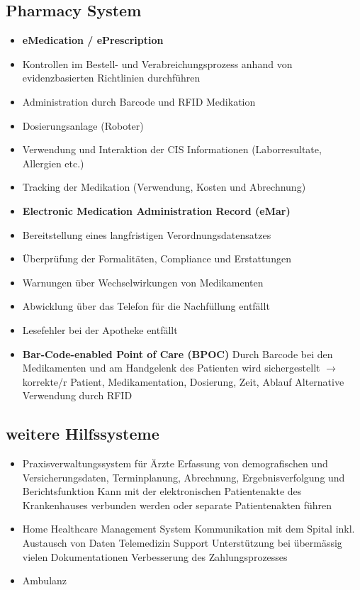 \documentclass{report}
\theoremstyle{definition}
\theoremstyle{example}
\begin{document}
\subsection{Pharmacy System}

\begin{itemize}
   \item \textbf{eMedication / ePrescription}
   \item Kontrollen im Bestell- und Verabreichungsprozess anhand von evidenzbasierten Richtlinien durchführen
   \item Administration durch Barcode und RFID Medikation
   \item Dosierungsanlage (Roboter)
   \item Verwendung und Interaktion der CIS Informationen (Laborresultate, Allergien etc.)
   \item Tracking der Medikation (Verwendung, Kosten und Abrechnung)
   \item \textbf{Electronic Medication Administration Record (eMar)}
   \item Bereitstellung eines langfristigen Verordnungsdatensatzes
   \item Überprüfung der Formalitäten, Compliance und Erstattungen
   \item Warnungen über Wechselwirkungen von Medikamenten
   \item Abwicklung über das Telefon für die Nachfüllung entfällt
   \item Lesefehler bei der Apotheke entfällt
   \item \textbf{Bar-Code-enabled Point of Care (BPOC)}
   \subitem Durch Barcode bei den Medikamenten und am Handgelenk des Patienten wird sichergestellt $\rightarrow$ korrekte/r Patient, Medikamentation, Dosierung, Zeit, Ablauf
   \subitem Alternative Verwendung durch RFID
\end{itemize}


\subsection{weitere Hilfssysteme}
\begin{itemize}
   \item Praxisverwaltungssystem für Ärzte
   \subitem Erfassung von demografischen und Versicherungsdaten, Terminplanung, Abrechnung, Ergebnisverfolgung und Berichtsfunktion
   \subitem Kann mit der elektronischen Patientenakte des Krankenhauses verbunden werden oder separate Patientenakten führen 
   \item Home Healthcare Management System
   \subitem Kommunikation mit dem Spital inkl. Austausch von Daten
   \subitem Telemedizin Support
   \subitem Unterstützung bei übermässig vielen Dokumentationen
   \subitem Verbesserung des Zahlungsprozesses
   \item Ambulanz
\end{itemize}
\end{document}
